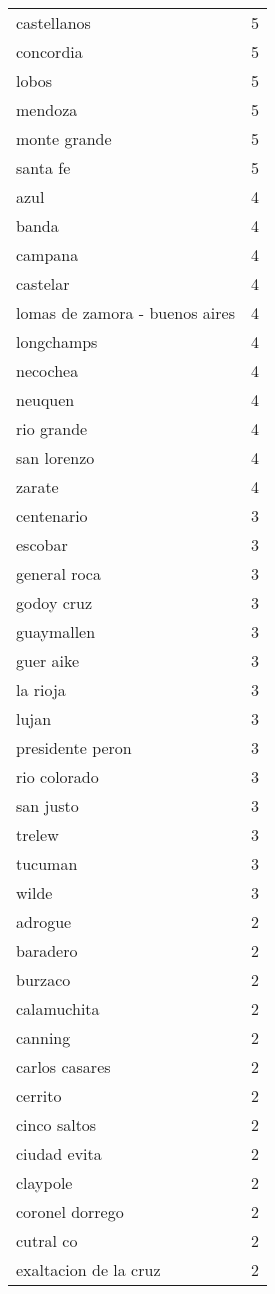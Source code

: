 \documentclass[
]{article}
\begin{document}
\begin{longtable}[t]{lr}
castellanos & 5\\
concordia & 5\\
lobos & 5\\
mendoza & 5\\
\addlinespace
monte grande & 5\\
santa fe & 5\\
azul & 4\\
banda & 4\\
campana & 4\\
\addlinespace
castelar & 4\\
lomas de zamora - buenos aires & 4\\
longchamps & 4\\
necochea & 4\\
neuquen & 4\\
\addlinespace
rio grande & 4\\
san lorenzo & 4\\
zarate & 4\\
centenario & 3\\
escobar & 3\\
\addlinespace
general roca & 3\\
godoy cruz & 3\\
guaymallen & 3\\
guer aike & 3\\
la rioja & 3\\
\addlinespace
lujan & 3\\
presidente peron & 3\\
rio colorado & 3\\
san justo & 3\\
trelew & 3\\
\addlinespace
tucuman & 3\\
wilde & 3\\
adrogue & 2\\
baradero & 2\\
burzaco & 2\\
\addlinespace
calamuchita & 2\\
canning & 2\\
carlos casares & 2\\
cerrito & 2\\
cinco saltos & 2\\
\addlinespace
ciudad evita & 2\\
claypole & 2\\
coronel dorrego & 2\\
cutral co & 2\\
exaltacion de la cruz & 2\\

\end{longtable}
\end{document}

